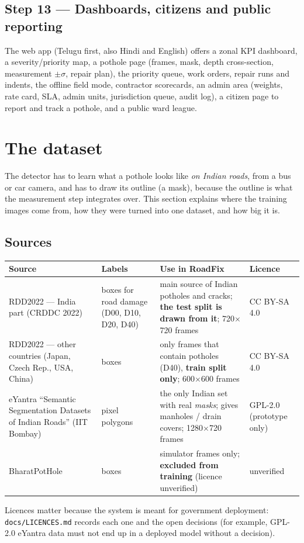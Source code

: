 \documentclass[11pt,a4paper]{article}
\newcommand{\code}[1]{\texttt{\small #1}}
\begin{document}
\subsection{Step 13 --- Dashboards, citizens and public reporting}
The web app (Telugu first, also Hindi and English) offers a zonal KPI dashboard, a severity/priority map, a pothole
page (frames, mask, depth cross-section, measurement $\pm\sigma$, repair plan), the priority queue, work orders,
repair runs and indents, the offline field mode, contractor scorecards, an admin area (weights, rate card, SLA, admin
units, jurisdiction queue, audit log), a citizen page to report and track a pothole, and a public ward league.

\section{The dataset}\label{sec:dataset}

The detector has to learn what a pothole looks like \emph{on Indian roads}, from a bus or car camera, and has to draw
its outline (a mask), because the outline is what the measurement step integrates over. This section explains where
the training images come from, how they were turned into one dataset, and how big it is.

\subsection{Sources}
\begin{center}
\small
\begin{tabularx}{\textwidth}{@{}>{\raggedright\arraybackslash}p{37mm} >{\raggedright\arraybackslash}p{26mm} X >{\raggedright\arraybackslash}p{24mm}@{}}
\toprule
\textbf{Source} & \textbf{Labels} & \textbf{Use in RoadFix} & \textbf{Licence}\\
\midrule
RDD2022 --- India part (CRDDC 2022) & boxes for road damage (D00, D10, D20, D40) & main source of Indian potholes and cracks; \textbf{the test split is drawn from it}; 720$\times$720 frames & CC BY-SA 4.0\\
RDD2022 --- other countries (Japan, Czech Rep., USA, China) & boxes & only frames that contain potholes (D40), \textbf{train split only}; 600$\times$600 frames & CC BY-SA 4.0\\
eYantra ``Semantic Segmentation Datasets of Indian Roads'' (IIT Bombay) & pixel polygons & the only Indian set with real \emph{masks}; gives manholes / drain covers; 1280$\times$720 frames & GPL-2.0 (prototype only)\\
BharatPotHole & boxes & simulator frames only; \textbf{excluded from training} (licence unverified) & unverified\\
\bottomrule
\end{tabularx}
\end{center}
Licences matter because the system is meant for government deployment: \code{docs/LICENCES.md} records each one and
the open decisions (for example, GPL-2.0 eYantra data must not end up in a deployed model without a decision).
\end{document}
